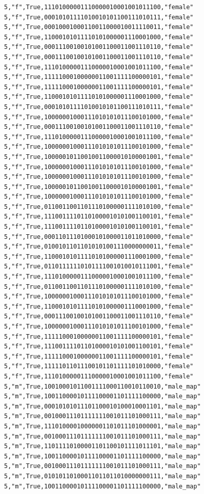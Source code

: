 \documentclass[authoryearcitations]{UoYCSproject}
\begin{document}
\begin{framed}
\begin{verbatim}
5,"f",True,11101000001110000010001001011100,"female"
5,"f",True,00010101111010010101100111010111,"female"
5,"f",True,00010001000110011000010011110011,"female"
5,"f",True,11000101011110101000001110001000,"female"
5,"f",True,00011100100101001100011001110110,"female"
5,"f",True,00011100100101001100011001110110,"female"
5,"f",True,11101000001110000010001001011100,"female"
5,"f",True,11111000100000011001111100000101,"female"
5,"f",True,11111000100000011001111100000101,"female"
5,"f",True,11000101011110101000001110001000,"female"
5,"f",True,00010101111010010101100111010111,"female"
5,"f",True,10000001000111010101011100101000,"female"
5,"f",True,00011100100101001100011001110110,"female"
5,"f",True,11101000001110000010001001011100,"female"
5,"f",True,10000001000111010101011100101000,"female"
5,"f",True,10000010110010011000010100001001,"female"
5,"f",True,10000001000111010101011100101000,"female"
5,"f",True,10000001000111010101011100101000,"female"
5,"f",True,10000010110010011000010100001001,"female"
5,"f",True,10000001000111010101011100101000,"female"
5,"f",True,01100110011011101000001111010100,"female"
5,"f",True,11100111101101000010101001100101,"female"
5,"f",True,11100111101101000010101001100101,"female"
5,"f",True,00011011101000101000011011010000,"female"
5,"f",True,01001011011010101001110000000011,"female"
5,"f",True,11000101011110101000001110001000,"female"
5,"f",True,01101111110101111001010010111001,"female"
5,"f",True,11101000001110000010001001011100,"female"
5,"f",True,01100110011011101000001111010100,"female"
5,"f",True,10000001000111010101011100101000,"female"
5,"f",True,11000101011110101000001110001000,"female"
5,"f",True,00011100100101001100011001110110,"female"
5,"f",True,10000001000111010101011100101000,"female"
5,"f",True,11111000100000011001111100000101,"female"
5,"f",True,11100111101101000010101001100101,"female"
5,"f",True,11111000100000011001111100000101,"female"
5,"f",True,11111011011100101101111101010000,"female"
5,"f",True,11101000001110000010001001011100,"female"
5,"m",True,10010001011001111000110010110010,"male_map"
5,"m",True,10011000010111100001101111100000,"male_map"
5,"m",True,00010101011101100010100010001101,"male_map"
5,"m",True,00100011101111111001011101000111,"male_map"
5,"m",True,11101000010000001101011101000001,"male_map"
5,"m",True,00100011101111111001011101000111,"male_map"
5,"m",True,11011110100001101100101111011101,"male_map"
5,"m",True,10011000010111100001101111100000,"male_map"
5,"m",True,00100011101111111001011101000111,"male_map"
5,"m",True,01010110100011011011010000000111,"male_map"
5,"m",True,10011000010111100001101111100000,"male_map"

\end{verbatim}
\end{framed}
\end{document}
